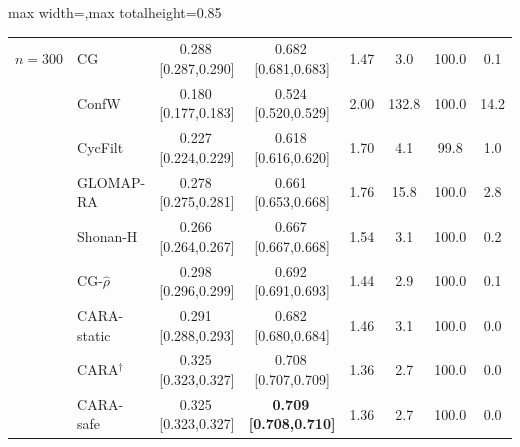 \begin{table}[!htbp]
\begin{adjustbox}{max width=\textwidth,max totalheight=0.85\textheight}
\begin{tabular}{llcccccc}
\midrule
$n{=}300$ & CG & 0.288\,{\scriptsize[0.287,0.290]} & 0.682\,{\scriptsize[0.681,0.683]} & 1.47 & 3.0 & 100.0 & 0.1\\
 & ConfW & 0.180\,{\scriptsize[0.177,0.183]} & 0.524\,{\scriptsize[0.520,0.529]} & 2.00 & 132.8 & 100.0 & 14.2\\
 & CycFilt & 0.227\,{\scriptsize[0.224,0.229]} & 0.618\,{\scriptsize[0.616,0.620]} & 1.70 & 4.1 & 99.8 & 1.0\\
 & GLOMAP-RA & 0.278\,{\scriptsize[0.275,0.281]} & 0.661\,{\scriptsize[0.653,0.668]} & 1.76 & 15.8 & 100.0 & 2.8\\
 & Shonan-H & 0.266\,{\scriptsize[0.264,0.267]} & 0.667\,{\scriptsize[0.667,0.668]} & 1.54 & 3.1 & 100.0 & 0.2\\
 & CG-$\hat\rho$ & 0.298\,{\scriptsize[0.296,0.299]} & 0.692\,{\scriptsize[0.691,0.693]} & 1.44 & 2.9 & 100.0 & 0.1\\
 & CARA-static & 0.291\,{\scriptsize[0.288,0.293]} & 0.682\,{\scriptsize[0.680,0.684]} & 1.46 & 3.1 & 100.0 & 0.0\\
 & CARA$^{\dagger}$ & 0.325\,{\scriptsize[0.323,0.327]} & 0.708\,{\scriptsize[0.707,0.709]} & 1.36 & 2.7 & 100.0 & 0.0\\
 & CARA-safe & 0.325\,{\scriptsize[0.323,0.327]} & \textbf{0.709\,{\scriptsize[0.708,0.710]}} & 1.36 & 2.7 & 100.0 & 0.0\\
\bottomrule
\end{tabular}\end{adjustbox}
\end{table}
